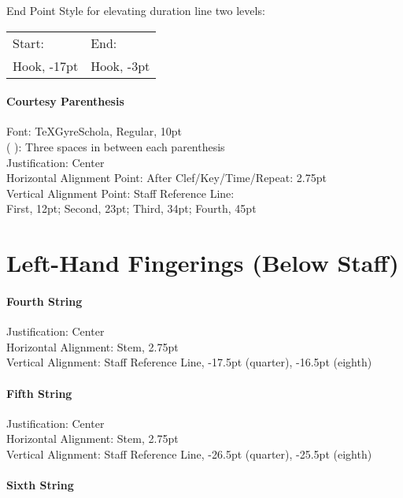 \documentclass[]{memoir}
\begin{document}
\noindent End Point Style for elevating duration line two levels:\\
\begin{tabular}{l l}
  Start: & End:\\
  Hook, -17pt & Hook, -3pt\\
\end{tabular}

\paragraph{Courtesy Parenthesis}
\label{sec:courtesy-parenthesis}

Font: TeXGyreSchola, Regular, 10pt\\
(   ): Three spaces in between each parenthesis\\
Justification: Center\\
Horizontal Alignment Point: After Clef/Key/Time/Repeat: 2.75pt\\
Vertical Alignment Point: Staff Reference Line:\\
\indent First, 12pt; Second, 23pt; Third, 34pt; Fourth, 45pt

\section{Left-Hand Fingerings (Below Staff)}
\label{sec:left-hand-fingerings}

\paragraph{Fourth String}
\label{sec:fourth-string}

Justification: Center\\
Horizontal Alignment: Stem, 2.75pt\\
Vertical Alignment: Staff Reference Line, -17.5pt (quarter), -16.5pt (eighth)

\paragraph{Fifth String}
\label{sec:fifth-string}

Justification: Center\\
Horizontal Alignment: Stem, 2.75pt\\
Vertical Alignment: Staff Reference Line, -26.5pt (quarter), -25.5pt (eighth)

\paragraph{Sixth String}
\label{sec:sixth-string}
\end{document}
